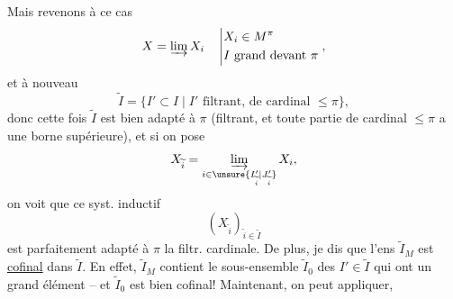 Mais revenons à ce cas
\[
X=\varinjlim X_i\quad\left|\begin{aligned}
&X_i\in M^{\pi}\\
&I\text{ grand devant }\pi
\end{aligned}\right.,
\]
et  à nouveau
\[
\widetilde I=\{I'\subset I\mid I'\text{ filtrant, de cardinal }\leq\pi\},
\]
donc cette fois $\widetilde I$ est  bien adapté à $\pi$ (filtrant, et toute partie  de cardinal $\leq\pi$ a une borne supérieure), et si on pose
\[
X_{\widetilde i}=\varinjlim_{i\in\unsure{I'_{\widetilde i}|J'_{\widetilde i}}}X_i,
\]
on voit que ce syst. inductif
\[
(X_{\widetilde i})_{\widetilde i\in\widetilde I}
\]
est parfaitement adapté à $\pi$  la filtr. cardinale. De plus, 
je dis que l'ens $\widetilde I_M$ est \uline{cofinal} dans $\widetilde I$. En effet,
$\widetilde I_M$ contient le sous-ensemble $\widetilde I_0$  des $I'\in\widetilde I$ qui ont un  grand élément -- et $\widetilde I_0$ est bien cofinal! Maintenant, on peut appliquer,
